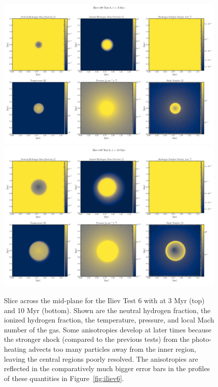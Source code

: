 \begin{figure}
\centering
\includegraphics[width=\textwidth]{figures/RHD/Iliev6/output_0003-NoRef.png}\\
\includegraphics[width=\textwidth]{figures/RHD/Iliev6/output_0010-NoRef.png}
\caption{
Slice across the mid-plane for the Iliev Test 6 with \GEARRT at 3 Myr (top) and 10 Myr (bottom).
Shown are the neutral hydrogen fraction, the ionized hydrogen fraction, the temperature, pressure,
and local Mach number of the gas. Some anisotropies develop at later times because the stronger
shock (compared to the previous tests) from the photo-heating advects too many particles away from
the inner region, leaving the central regions poorly resolved. The anisotropies are reflected in
the comparatively much bigger error bars in the profiles of these quantities in
Figure~\ref{fig:iliev6}.
}
\label{fig:iliev6-slices}
\end{figure}



